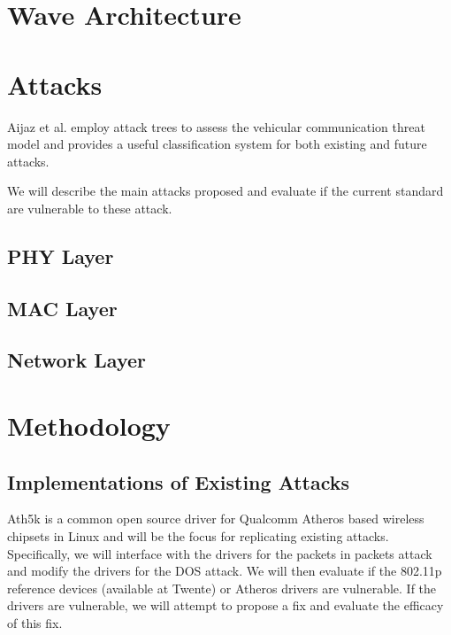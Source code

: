 \documentclass[conference]{IEEEtran}
\begin{document}
\section{Wave Architecture}



\section{Attacks}
Aijaz et al. \cite{aijaz2006attacks} employ attack trees to assess the vehicular communication threat model and provides a useful classification system for both existing and future attacks. 

We will describe the main attacks proposed and evaluate if the current standard are vulnerable to these attack. 



\subsection{PHY Layer}


\subsection{MAC Layer}




\subsection{Network Layer}



\section{Methodology}
\subsection{ Implementations of Existing Attacks}
\label{sec:existing_attacks}
Ath5k is a common open source driver for Qualcomm Atheros based wireless chipsets in Linux and will be the focus for replicating existing attacks. Specifically, we will interface with the drivers for the packets in packets attack and modify the drivers for the DOS attack. We will then evaluate if the 802.11p reference devices (available at Twente) or Atheros drivers are vulnerable. If the drivers are vulnerable, we will attempt to propose a fix and evaluate the efficacy of this fix.\\
\end{document}
